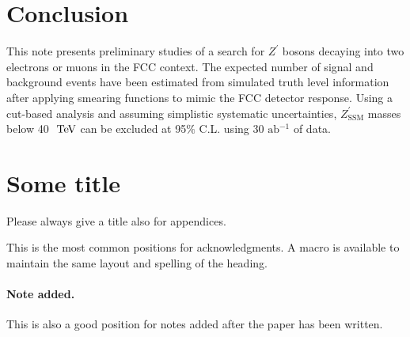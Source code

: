 \documentclass[a4paper,11pt]{article}
\newcommand{\Zp}{\ensuremath{Z^{\prime}}}
\newcommand{\ZpSSM}{\ensuremath{Z^{\prime}_{\mathrm{SSM}}}}
\def\afb{\mbox{ab$^{-1}$}}%
\def\TeV{\ifmmode {\mathrm{\ Te\kern -0.1em V}}\else
                   \textrm{Te\kern -0.1em V}\fi}%
\begin{document}
\section{Conclusion}
\label{sec:conc}

This note presents preliminary studies of a search for $\Zp$
bosons decaying into two electrons or muons in the FCC context. The expected number
of signal and background events have been estimated from simulated truth level information
after applying smearing functions to mimic the FCC detector response.
Using a cut-based analysis and assuming simplistic systematic uncertainties, $\ZpSSM$
masses below 40 $\TeV$ can be excluded at 95$\%$ C.L.
using 30 $\afb{}$ of data.

\appendix
\section{Some title}
Please always give a title also for appendices.





\acknowledgments

This is the most common positions for acknowledgments. A macro is
available to maintain the same layout and spelling of the heading.

\paragraph{Note added.} This is also a good position for notes added
after the paper has been written.










\end{document}
